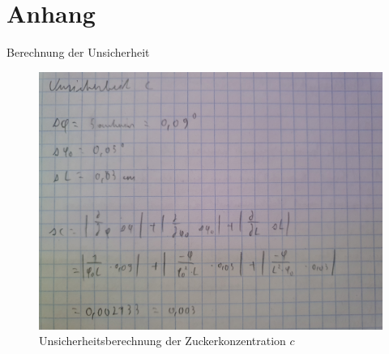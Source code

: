 \documentclass[12pt,a4paper,twoside]{article}
\begin{document}
\section{Anhang}
Berechnung der Unsicherheit
\begin{figure}[H]
    \centering
    \includegraphics[width=0.6\linewidth]{nudes/unsicherheit.jpg}
    \caption{Unsicherheitsberechnung der Zuckerkonzentration $c$}
    \label{fig:Unsicherheitswix}
\end{figure}

\printbibliography[heading=bibintoc]
\end{document}
